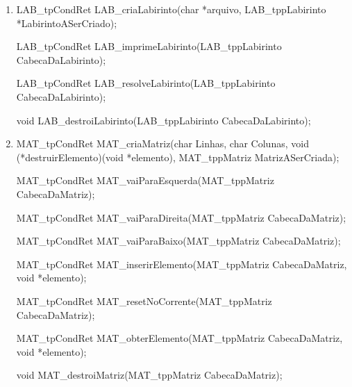 \documentclass[a4paper,12pt,oneside]{book}
\begin{document}
\begin{enumerate}

    \item 
    
    LAB\_tpCondRet LAB\_criaLabirinto(char *arquivo, LAB\_tppLabirinto *LabirintoASerCriado);

    LAB\_tpCondRet LAB\_imprimeLabirinto(LAB\_tppLabirinto CabecaDaLabirinto);
    
    LAB\_tpCondRet LAB\_resolveLabirinto(LAB\_tppLabirinto CabecaDaLabirinto);

    void LAB\_destroiLabirinto(LAB\_tppLabirinto CabecaDaLabirinto);

    \item 
    
    MAT\_tpCondRet MAT\_criaMatriz(char Linhas, char Colunas, void (*destruirElemento)(void *elemento), MAT\_tppMatriz MatrizASerCriada);
    
    MAT\_tpCondRet MAT\_vaiParaEsquerda(MAT\_tppMatriz CabecaDaMatriz);
    
    MAT\_tpCondRet MAT\_vaiParaDireita(MAT\_tppMatriz CabecaDaMatriz);
    
    MAT\_tpCondRet MAT\_vaiParaBaixo(MAT\_tppMatriz CabecaDaMatriz);
    
    MAT\_tpCondRet MAT\_inserirElemento(MAT\_tppMatriz CabecaDaMatriz, void *elemento);
    
    MAT\_tpCondRet MAT\_resetNoCorrente(MAT\_tppMatriz CabecaDaMatriz);
    
    MAT\_tpCondRet MAT\_obterElemento(MAT\_tppMatriz CabecaDaMatriz, void *elemento);
    
    void MAT\_destroiMatriz(MAT\_tppMatriz CabecaDaMatriz);

\end{enumerate}

% 
% 
% 
% 
% 
% 
% 
\end{document}
